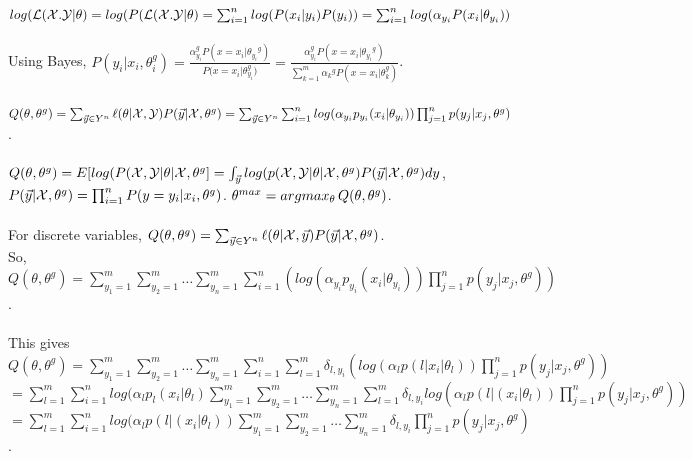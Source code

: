 $log({\cal L}( {\cal X}. {\cal Y} | \theta)= log(P({\cal L}( {\cal X}. {\cal Y} | \theta) =
\sum_{i=1}^n log(P(x_i | y_i) P(y_i))=
\sum_{i=1}^n log( \alpha_{y_i} P(x_i | \theta_{y_i}))$
\\
\\
Using Bayes,
$P(y_i | x_i, \theta_i^g) = {\frac {\alpha_{y_i}^g P(x=x_i | {\theta_{y_i}}^g)} {P(x=x_i | {\theta_{y_i}^g)}} }
= {\frac {\alpha_{y_i}^g P(x=x_i | {\theta_{y_i}}^g)} {\sum_{k=1}^m {\alpha_k}^g P(x= x_i | \theta_k^g)}}$.
\\
\\
$Q(\theta, \theta^g) = \sum_{{\vec y} \in Y^n} \ell (\theta | {\cal X}, {\cal Y}) P({\vec y} | {\cal X}, \theta^g)=
\sum_{{\vec y} \in Y^n} \sum_{i=1}^n log(\alpha_{y_i} p_{y_i}(x_i | \theta_{y_i})) \prod_{j=1}^n p(y_j| x_j, \theta^g)$.
\\
\\
$Q(\theta, \theta^g)= E[log(P({\cal X}, {\cal Y} | \theta | {\cal X}, \theta^g]=
\int_{\vec y} log(p({\cal X}, {\cal Y} | \theta | {\cal X}, \theta^g) P({\vec y}| {\cal X}, \theta^g) dy$,
$P({\vec y} | {\cal X}, \theta^g)= \prod_{i=1}^n P(y=y_i| x_i, \theta^g)$.
$\theta^{max} = argmax_{\theta} \thinspace Q(\theta, \theta^g)$.
\\
\\
For discrete variables,
$Q(\theta, \theta^g) = \sum_{{\vec y} \in Y^n} \ell (\theta | {\cal X}, {\vec y}) P({\vec y} | {\cal X}, \theta^g)$.
\\
So,
$Q(\theta, \theta^g)=
\sum_{y_1 =1}^m
\sum_{y_2 =1}^m \ldots
\sum_{y_n =1}^m \sum_{i=1}^n  (log(\alpha_{y_i} p_{y_i}(x_i | \theta_{y_i})) \prod _{j=1}^n p(y_j| x_j, \theta^g))$.
\\
\\
This gives
\\
$Q(\theta, \theta^g)=
\sum_{y_1 =1}^m
\sum_{y_2 =1}^m \ldots
\sum_{y_n =1}^m \sum_{i=1}^n  \sum_{l=1}^m \delta_{l, y_i} (log(\alpha_{l} p(l|x_i | \theta_{l})) \prod _{j=1}^n p(y_j| x_j, \theta^g))$
\\
$ = \sum_{l=1}^m \sum_{i=1}^n log(\alpha_l p_l(x_i | \theta_l)
\sum_{y_1 =1}^m
\sum_{y_2 =1}^m \ldots
\sum_{y_n =1}^m
\sum_{l =1}^m \delta_{l, y_i} log(\alpha_{l} p(l|(x_i | \theta_{l})) \prod _{j=1}^n p(y_j| x_j, \theta^g))$
\\
$= \sum_{l=1}^m \sum_{i=1}^n 
log(\alpha_{l} p(l|(x_i | \theta_{l}))
\sum_{y_1 =1}^m
\sum_{y_2 =1}^m \ldots
\sum_{y_n =1}^m \delta_{l, y_i} \prod _{j=1}^n p(y_j| x_j, \theta^g)$.
\\
\\
